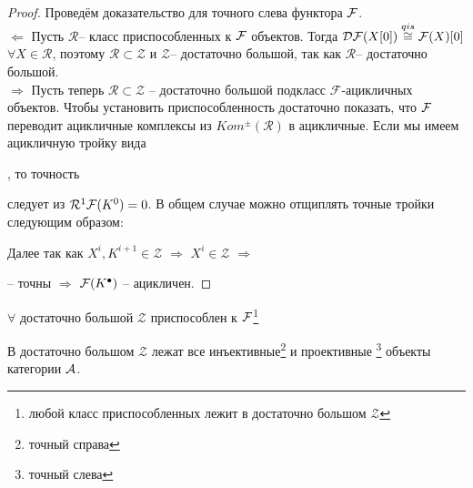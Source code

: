 \documentclass[../hw_main.tex]{subfiles}
\begin{document}
\begin{proof} Проведём доказательство для точного слева функтора $\mathcal{F}$.\\
$\Leftarrow$ Пусть $\mathcal{R}$-- класс приспособленных к $\mathcal{F}$ объектов. Тогда $\mathcal{D F}(X[0])\overset{qis}{\cong} \mathcal{F}(X)[0]$ $\forall X \in \mathcal{R}$, поэтому $\mathcal{R} \subset \mathcal{Z}$ и $\mathcal{Z}$-- достаточно большой, так как $\mathcal{R}$-- достаточно большой.\\
$\Rightarrow$ Пусть теперь $\mathcal{R} \subset \mathcal{Z}$ -- достаточно большой подкласс $\mathcal{F}$-ацикличных объектов. Чтобы установить приспособленность достаточно показать, что $\mathcal{F}$ переводит ацикличные комплексы из $Kom^{\pm}(\mathcal{R})$ в ацикличные. Если мы имеем ацикличную тройку вида , то точность  следует из $\mathcal{R}^1\mathcal{F}(K^0)=0$. В общем случае можно отщиплять точные тройки следующим образом:
\bee
{}
\eee
Далее так как $X^i, K^{i+1} \in \mathcal{Z}$ $\Rightarrow$ $X^i \in \mathcal{Z}$ $\Rightarrow$  -- точны $\Rightarrow$ $\mathcal{F}(K^\bullet)$ -- ацикличен.
\end{proof}
\begin{to_claim}
$\forall$ достаточно большой $\mathcal{Z}$ приспособлен к $\mathcal{F}$\footnote{любой класс приспособленных лежит в достаточно большом $\mathcal{Z}$}
\end{to_claim}
\begin{to_claim}
В достаточно большом $\mathcal{Z}$ лежат все инъективные\footnote{точный справа} и проективные \footnote{точный слева} объекты категории $\mathcal{A}$.
\end{to_claim}
\end{document}
